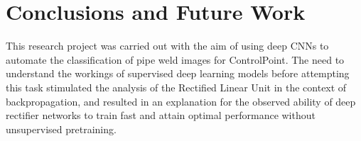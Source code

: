\documentclass[a4paper,11pt]{article}
\begin{document}
%
%
%
%
%
%
%
%
%
%
%



\clearpage
\section{Conclusions and Future Work}

This research project was carried out with the aim of using deep CNNs to automate the classification of pipe weld images for ControlPoint. The need to understand the workings of supervised deep learning models before attempting this task stimulated the analysis of the Rectified Linear Unit in the context of backpropagation, and resulted in an explanation for the observed ability of deep rectifier networks to train fast and attain optimal performance without unsupervised pretraining. \\
\end{document}
